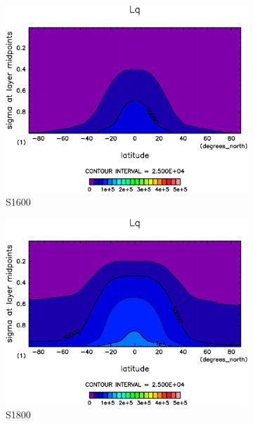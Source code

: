 \documentclass[body]{subfiles}
\begin{document}
\begin{figure}[t]
\begin{subfigure}{.4\textwidth}
		\includegraphics[width=\columnwidth]{S1600/Lq,time=3650:4015-crop-rotate.pdf}
		\caption{S1600}\label{LqS1600}
	\end{subfigure}
	\begin{subfigure}{.4\textwidth}
		\centering
		\includegraphics[width=\columnwidth]{S1800/Lq,time=3650:4015-crop-rotate.pdf}
		\caption{S1800}\label{LqS1800}
	\end{subfigure}
	\begin{subfigure}{.4\textwidth}
		\centering

\end{subfigure}
\end{figure}
\end{document}
